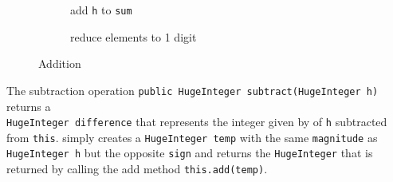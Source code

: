 \documentclass[12pt]{article}
\newcommand{\code}[1]{\texttt{#1}}
\begin{document}
\begin{figure}[h!]
\begin{subfigure}[b]{0.475\textwidth}
        \caption{add \code{h} to \code{sum}}
    \end{subfigure}
    \hfill
    \begin{subfigure}[b]{0.427\textwidth}
        \centering
        \caption{reduce elements to 1 digit}
    \end{subfigure}
    \caption{Addition}
\end{figure}

The subtraction operation \code{public HugeInteger subtract(HugeInteger h)} returns a \\ \code{HugeInteger difference} that represents the integer given by of \code{h} subtracted from \code{this}. simply creates a \code{HugeInteger temp} with the same \code{magnitude} as \code{HugeInteger h} but the opposite \code{sign} and returns the \code{HugeInteger} that is returned by calling the add method \code{this.add(temp)}.
\end{document}
